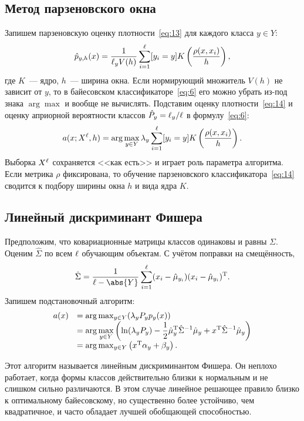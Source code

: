 \subsection{Метод парзеновского окна}
Запишем парзеновскую оценку плотности~\eqref{eq:13} для каждого класса \( y\in Y \):
\begin{equation}
  \hat{p}_{y, h}(x) = \frac{1}{\ell_yV(h)}\sum_{i = 1}^\ell [y_i = y]
  K\left(\frac{\rho(x, x_i)}{h}\right),
  \label{eq:14}
\end{equation}
где \( K \)~--- ядро, \( h \)~--- ширина окна. Если нормирующий множитель \( V(h) \) не зависит
от \( y \), то в байесовском классификаторе~\eqref{eq:6} его можно убрать из-под знака
\( \arg\max \) и вообще не вычислять. Подставим оценку плотности~\eqref{eq:14} и оценку априорной
вероятности классов \( \hat{P}_y = \ell_y/\ell \) в формулу~\eqref{eq:6}:
\begin{equation}
  a(x; X^\ell, h) = \arg\max_{y\in Y}\lambda_y\sum_{i = 1}^\ell[y_i = y]
  K\left(\frac{\rho(x, x_i)}{h}\right).
  \label{eq:15}
\end{equation}
Выборка \( X^\ell \) сохраняется <<как есть>> и играет роль параметра алгоритма. Если метрика
\( \rho \) фиксирована, то обучение парзеновского классификатора~\eqref{eq:14} сводится к подбору
ширины окна \( h \) и вида ядра \( K \).
\subsection{Линейный дискриминант Фишера}
Предположим, что ковариационные матрицы классов одинаковы и равны \( \Sigma \). Оценим
\( \hat{\Sigma} \) по всем \( \ell \) обучающим объектам. С учётом поправки на смещённость,
\[
  \hat{\Sigma} = \frac{1}{\l - \abs{Y}}\sum_{i = 1}^\l (x_i - \hat{\mu}_{y_i})
  (x_i - \hat{\mu}_{y_i})^\T.
\]
Запишем подстановочный алгоритм:
\begin{equation}
  \begin{array}{rl}
    a(x) & = \arg\max_{y\in Y} (\lambda_yP_yp_y(x)) \\
    & = \displaystyle\arg\max_{y\in Y}\left(\ln(\lambda_yP_y) -
  \frac{1}{2}\hat{\mu}_y^{\mathrm{T}}\hat{\Sigma}^{-1}\hat{\mu}_y + x^{\mathrm{T}}\hat{\Sigma}^{-1}
  \hat{\mu}_y\right) \\
    & = \arg\max_{y\in Y}\left(x^{\mathrm{T}}\alpha_y + \beta_y\right).
  \end{array}
\end{equation}

Этот алгоритм называется линейным дискриминантом Фишера. Он неплохо работает, когда формы классов
действительно близки к нормальным и не слишком сильно различаются. В этом случае линейное решающее
правило близко к оптимальному байесовскому, но существенно более устойчиво, чем квадратичное, и часто
обладает лучшей обобщающей способностью.

